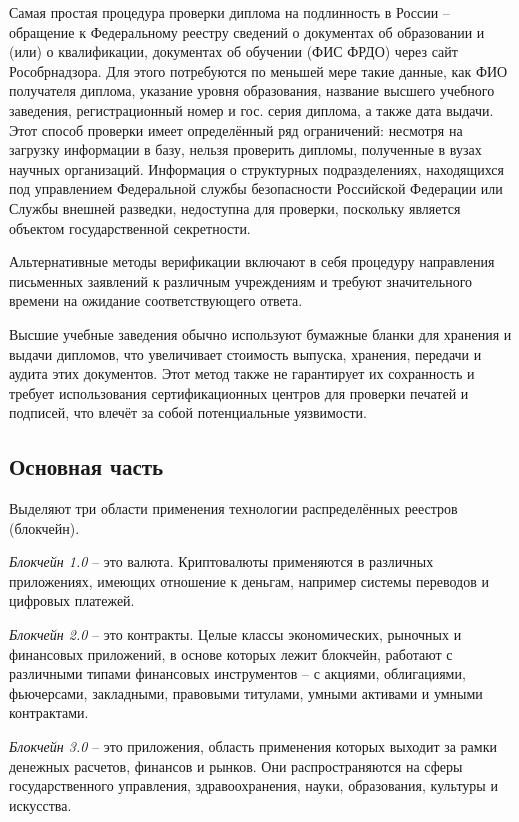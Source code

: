 \documentclass{mirea-article}
\begin{document}
Самая простая процедура проверки диплома на подлинность в России – обращение к Федеральному реестру сведений о документах об образовании и (или) о квалификации, документах об обучении (ФИС ФРДО) через сайт Рособрнадзора. Для этого потребуются по меньшей мере такие данные, как ФИО получателя диплома, указание уровня образования, название высшего учебного заведения, регистрационный номер и гос. серия диплома, а также дата выдачи. Этот способ проверки имеет определённый ряд ограничений: несмотря на загрузку информации в базу, нельзя проверить дипломы, полученные в вузах научных организаций. Информация о структурных подразделениях, находящихся под управлением Федеральной службы безопасности Российской Федерации или Службы внешней разведки, недоступна для проверки, поскольку является объектом государственной секретности. ~\cite{bib:proverka-diplomov}

Альтернативные методы верификации включают в себя процедуру направления письменных заявлений к различным учреждениям и требуют значительного времени на ожидание соответствующего ответа.

Высшие учебные заведения обычно используют бумажные бланки для хранения и выдачи дипломов, что увеличивает стоимость выпуска, хранения, передачи и аудита этих документов. Этот метод также не гарантирует их сохранность и требует использования сертификационных центров для проверки печатей и подписей, что влечёт за собой потенциальные уязвимости.

\subsection*{Основная часть}

Выделяют три области применения технологии распределённых реестров (блокчейн).

\textit{Блокчейн 1.0} – это валюта. Криптовалюты применяются в различных приложениях, имеющих отношение к деньгам, например системы переводов и цифровых платежей.

\textit{Блокчейн 2.0} – это контракты. Целые классы экономических, рыночных и финансовых приложений, в основе которых лежит блокчейн, работают с различными типами финансовых инструментов – с акциями, облигациями, фьючерсами, закладными, правовыми титулами, умными активами и умными контрактами.

\textit{Блокчейн 3.0} – это приложения, область применения которых выходит за рамки денежных расчетов, финансов и рынков. Они распространяются на сферы государственного управления, здравоохранения, науки, образования, культуры и искусства.~\cite{bib:swan-chain}
\end{document}
